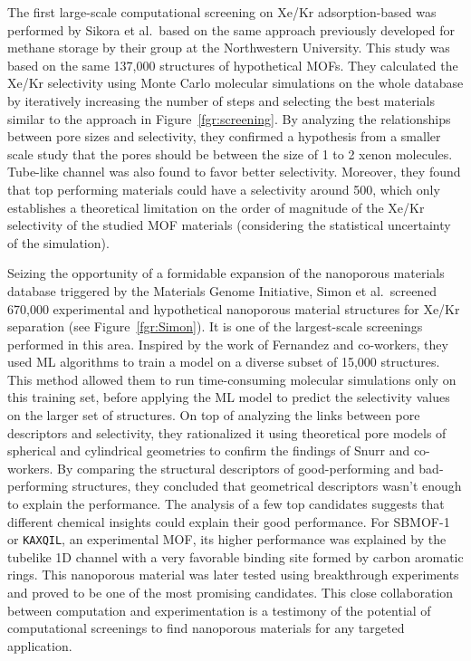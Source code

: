 \documentclass[main.tex]{subfiles}
\begin{document}
The first large-scale computational screening on Xe/Kr adsorption-based was performed by Sikora et al.\ based on the same approach previously developed for methane storage by their group at the Northwestern University.\autocite{Sikora_2012} This study was based on the same {137,000} structures of hypothetical MOFs.\autocite{Wilmer_2012} They calculated the Xe/Kr selectivity using Monte Carlo molecular simulations on the whole database by iteratively increasing the number of steps and selecting the best materials similar to the approach in Figure~\ref{fgr:screening}. By analyzing the relationships between pore sizes and selectivity, they confirmed a hypothesis from a smaller scale study that the pores should be between the size of 1 to 2 xenon molecules.\autocite{Ryan_2010} Tube-like channel was also found to favor better selectivity. Moreover, they found that top performing materials could have a selectivity around 500, which only establishes a theoretical limitation on the order of magnitude of the Xe/Kr selectivity of the studied MOF materials (considering the statistical uncertainty of the simulation).

Seizing the opportunity of a formidable expansion of the nanoporous materials database triggered by the Materials Genome Initiative, Simon et al.\ screened 670,000 experimental and hypothetical nanoporous material structures for Xe/Kr separation (see Figure~\ref{fgr:Simon}).\autocite{Simon_2015} It is one of the largest-scale screenings performed in this area. Inspired by the work of Fernandez and co-workers,\autocite{Fernandez_2013} they used ML algorithms to train a model on a diverse subset of 15,000 structures. This method allowed them to run time-consuming molecular simulations only on this training set, before applying the ML model to predict the selectivity values on the larger set of structures. On top of analyzing the links between pore descriptors and selectivity, they rationalized it using theoretical pore models of spherical and cylindrical geometries to confirm the findings of Snurr and co-workers.\autocite{Ryan_2010,Sikora_2012} By comparing the structural descriptors of good-performing and bad-performing structures, they concluded that geometrical descriptors wasn't enough to explain the performance. The analysis of a few top candidates suggests that different chemical insights could explain their good performance. For SBMOF-1 or \texttt{KAXQIL},\autocite{KAXQIL} an experimental MOF, its higher performance was explained by the tubelike 1D channel with a very favorable binding site formed by carbon aromatic rings. This nanoporous material was later tested using breakthrough experiments and proved to be one of the most promising candidates.\autocite{Banerjee_2016} This close collaboration between computation and experimentation is a testimony of the potential of computational screenings to find nanoporous materials for any targeted application.
\end{document}
